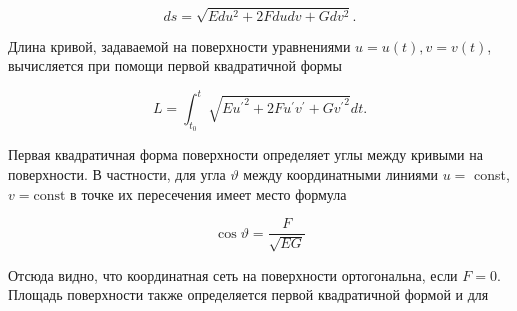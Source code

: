 \documentclass[10pt]{article}
\begin{document}
\[

d s=\sqrt{E d u^{2}+2 F d u d v+G d v^{2}} .

\]



Длина кривой, задаваемой на поверхности уравнениями $u=u(t), v=v(t)$, вычисляется при помощи первой квадратичной формы



\[

L=\int_{t_{0}}^{t} \sqrt{E{u^{\prime}}^{2}+2 F u^{\prime} v^{\prime}+G{v^{\prime}}^{2}} d t .

\]



Первая квадратичная форма поверхности определяет углы между кривыми на поверхности. В частности, для угла $\vartheta$ между координатными линиями $u=$ const, $v=\mathrm{const}$ в точке их пересечения имеет место формула



\[

\cos \vartheta=\frac{F}{\sqrt{E G}}

\]



Отсюда видно, что координатная сеть на поверхности ортогональна, если $F=0$. Площадь поверхности также определяется первой квадратичной формой и для
\end{document}
